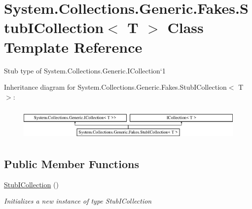\hypertarget{class_system_1_1_collections_1_1_generic_1_1_fakes_1_1_stub_i_collection_3_01_t_01_4}{\section{System.\-Collections.\-Generic.\-Fakes.\-Stub\-I\-Collection$<$ T $>$ Class Template Reference}
\label{class_system_1_1_collections_1_1_generic_1_1_fakes_1_1_stub_i_collection_3_01_t_01_4}
}


Stub type of System.\-Collections.\-Generic.\-I\-Collection`1 


Inheritance diagram for System.\-Collections.\-Generic.\-Fakes.\-Stub\-I\-Collection$<$ T $>$\-:\begin{figure}[H]
\begin{center}
\leavevmode
\includegraphics[height=1.686747cm]{class_system_1_1_collections_1_1_generic_1_1_fakes_1_1_stub_i_collection_3_01_t_01_4}
\end{center}
\end{figure}
\subsection*{Public Member Functions}
\begin{DoxyCompactItemize}
\item 
\hyperlink{class_system_1_1_collections_1_1_generic_1_1_fakes_1_1_stub_i_collection_3_01_t_01_4_accc2a3fcd1b9991704ebf2ca3fe83893}{Stub\-I\-Collection} ()
\begin{DoxyCompactList}\small\item\em Initializes a new instance of type Stub\-I\-Collection\end{DoxyCompactList}\end{DoxyCompactItemize}
